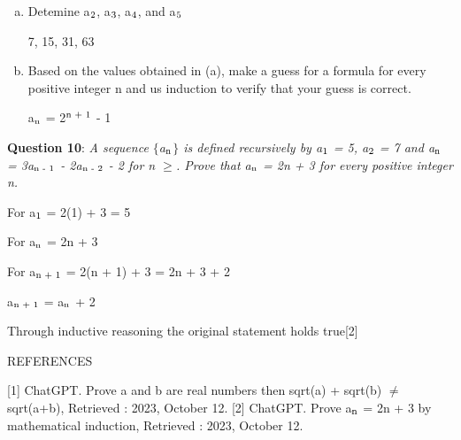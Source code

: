 \documentclass{article} %
\newcommand{\question}[2][]{\begin{flushleft}
        \textbf{Question #1}: \textit{#2}

\end{flushleft}}
\begin{document}
    \begin{enumerate}[(a)]
        \item {Detemine a$\textsubscript{2}$, a$\textsubscript{3}$, a$\textsubscript{4}$, and a$\textsubscript{5}$}
        
        7, 15, 31, 63
        \item {Based on the values obtained in (a), make a guess for a formula for every positive integer n and us induction to verify that your guess is correct.}
        
        a$\textsubscript{n}$ = 2$\textsuperscript{n + 1}$ - 1
        
    \end{enumerate}

    \question[10]{A sequence $\{$a$\textsubscript{n}$$\}$ is defined recursively by a$\textsubscript{1}$ = 5, a$\textsubscript{2}$ = 7 and a$\textsubscript{n}$ = 3a$\textsubscript{n - 1}$ - 2a$\textsubscript{n - 2}$ - 2 for n $\geq$. Prove that a$\textsubscript{n}$ = 2n + 3 for every positive integer n.}

    For a$\textsubscript{1}$ = 2(1) + 3 = 5

    For a$\textsubscript{n}$ = 2n + 3

    For a$\textsubscript{n + 1}$ = 2(n + 1) + 3 = 2n + 3 + 2

    a$\textsubscript{n + 1}$ = a$\textsubscript{n}$ + 2

    Through inductive reasoning the original statement holds true[2]

    \begin{center}
        REFERENCES
    \end{center}

    [1] ChatGPT. Prove a and b are real numbers then sqrt(a) + sqrt(b) $\neq$ sqrt(a+b), Retrieved : 2023, October 12.
    [2] ChatGPT. Prove a$\textsubscript{n}$ = 2n + 3 by mathematical induction, Retrieved : 2023, October 12. 
\end{document}
